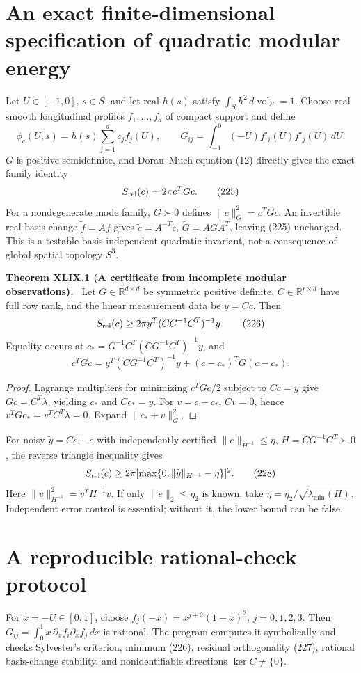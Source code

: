 \documentclass[11pt,a4paper,oneside]{book}
\newcommand{\R}{\mathbb R}\newcommand{\C}{\mathbb C}\newcommand{\Z}{\mathbb Z}\newcommand{\N}{\mathbb N}\newcommand{\Q}{\mathbb Q}
\newcommand{\statement}[3]{\par\medskip\noindent\textbf{#1 #2 (#3).}\ }
\begin{document}
\section{An exact finite-dimensional specification of quadratic modular energy}
Let $U\in[-1,0]$, $s\in S$, and let real $h(s)$ satisfy $\int_Sh^2\,d\operatorname{vol}_S=1$. Choose real smooth longitudinal profiles $f_1,\ldots,f_d$ of compact support and define
\[\phi_c(U,s)=h(s)\sum_{j=1}^dc_jf_j(U),\qquad G_{ij}=\int_{-1}^0(-U)f'_i(U)f'_j(U)\,dU.\]
$G$ is positive semidefinite, and Dorau--Much equation (12) directly gives the exact family identity
\begin{equation}S_{\rm rel}(c)=2\pi c^TGc.\tag{225}\end{equation}
For a nondegenerate mode family, $G\succ0$ defines $\|c\|_G^2=c^TGc$. An invertible real basis change $\widetilde f=Af$ gives $\widetilde c=A^{-T}c$, $\widetilde G=AGA^T$, leaving (225) unchanged. This is a testable basis-independent quadratic invariant, not a consequence of global spatial topology $S^3$.
\statement{Theorem}{XLIX.1}{A certificate from incomplete modular observations}
Let $G\in\R^{d\times d}$ be symmetric positive definite, $C\in\R^{r\times d}$ have full row rank, and the linear measurement data be $y=Cc$. Then
\begin{equation}S_{\rm rel}(c)\ge2\pi y^T(CG^{-1}C^T)^{-1}y.\tag{226}\end{equation}
Equality occurs at $c_*=G^{-1}C^T(CG^{-1}C^T)^{-1}y$, and
\begin{equation}c^TGc=y^T(CG^{-1}C^T)^{-1}y+(c-c_*)^TG(c-c_*).\tag{227}\end{equation}
\begin{proof}
Lagrange multipliers for minimizing $c^TGc/2$ subject to $Cc=y$ give $Gc=C^T\lambda$, yielding $c_*$ and $Cc_*=y$. For $v=c-c_*$, $Cv=0$, hence $v^TGc_*=v^TC^T\lambda=0$. Expand $\|c_*+v\|_G^2$.
\end{proof}
For noisy $\widetilde y=Cc+e$ with independently certified $\|e\|_{H^{-1}}\le\eta$, $H=CG^{-1}C^T\succ0$, the reverse triangle inequality gives
\begin{equation}S_{\rm rel}(c)\ge2\pi[\max\{0,\|\widetilde y\|_{H^{-1}}-\eta\}]^2.\tag{228}\end{equation}
Here $\|v\|_{H^{-1}}^2=v^TH^{-1}v$. If only $\|e\|_2\le\eta_2$ is known, take $\eta=\eta_2/\sqrt{\lambda_{\min}(H)}$. Independent error control is essential; without it, the lower bound can be false.
\section{A reproducible rational-check protocol}
For $x=-U\in[0,1]$, choose $f_j(-x)=x^{j+2}(1-x)^2$, $j=0,1,2,3$. Then $G_{ij}=\int_0^1x\,\partial_xf_i\partial_xf_j\,dx$ is rational. The program  computes it symbolically and checks Sylvester's criterion, minimum (226), residual orthogonality (227), rational basis-change stability, and nonidentifiable directions $\ker C\ne\{0\}$.
\end{document}
